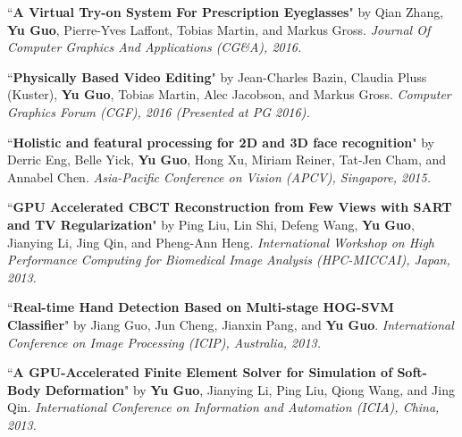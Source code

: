 \documentclass[margin,line]{resume}
\begin{document}
\begin{resume}
    ``\textbf{A Virtual Try-on System For Prescription Eyeglasses}" 
    by Qian Zhang, \textbf{Yu Guo}, Pierre-Yves Laffont, Tobias Martin, and Markus Gross. 
    \textsl{Journal Of Computer Graphics And Applications (CG\&A), 2016.}\\

    \vspace{-5mm}

    ``\textbf{Physically Based Video Editing}" 
    by Jean-Charles Bazin, Claudia Pluss (Kuster), \textbf{Yu Guo}, Tobias Martin, Alec Jacobson, and Markus Gross. 
    \textsl{Computer Graphics Forum (CGF), 2016 (Presented at PG 2016).}\\

    \vspace{-5mm}

    ``\textbf{Holistic and featural processing for 2D and 3D face recognition}" 
    by Derric Eng, Belle Yick, \textbf{Yu Guo}, Hong Xu, Miriam Reiner, Tat-Jen Cham, and Annabel Chen. 
    \textsl{Asia-Pacific Conference on Vision (APCV), Singapore, 2015.}\\

    \vspace{-5mm}

    ``\textbf{GPU Accelerated CBCT Reconstruction from Few Views with SART and TV Regularization}" 
    by Ping Liu, Lin Shi, Defeng Wang, \textbf{Yu Guo}, Jianying Li, Jing Qin, and Pheng-Ann Heng. 
    \textsl{International Workshop on High Performance Computing for Biomedical Image Analysis (HPC-MICCAI), Japan, 2013.}\\

    \vspace{-5mm}

    ``\textbf{Real-time Hand Detection Based on Multi-stage HOG-SVM Classifier}" 
    by Jiang Guo, Jun Cheng, Jianxin Pang, and \textbf{Yu Guo}. 
    \textsl{International Conference on Image Processing (ICIP), Australia, 2013.}\\

    \vspace{-5mm}

    ``\textbf{A GPU-Accelerated Finite Element Solver for Simulation of Soft-Body Deformation}" 
    by \textbf{Yu Guo}, Jianying Li, Ping Liu, Qiong Wang, and Jing Qin. 
    \textsl{International Conference on Information and Automation (ICIA), China, 2013.}\\

    \vspace{-5mm}


\end{resume}
\end{document}
